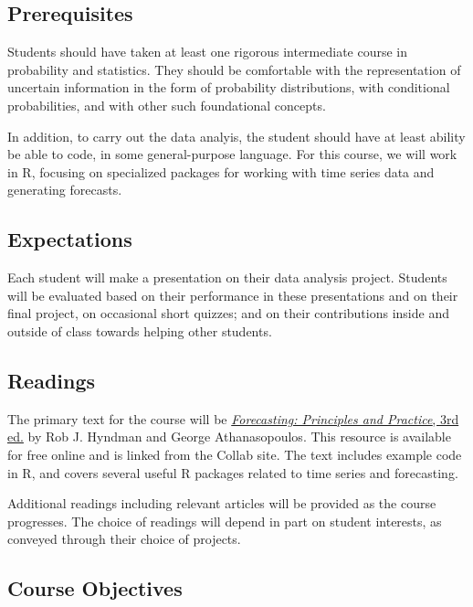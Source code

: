 \documentclass[
]{book}
\begin{document}
\hypertarget{prerequisites}{%
\subsection*{Prerequisites}\label{prerequisites}}

Students should have taken at least one rigorous intermediate course in probability and statistics. They should be comfortable with the representation of uncertain information in the form of probability distributions, with conditional probabilities, and with other such foundational concepts.

In addition, to carry out the data analyis, the student should have at least ability be able to code, in some general-purpose language. For this course, we will work in R, focusing on specialized packages for working with time series data and generating forecasts.

\hypertarget{expectations}{%
\subsection*{Expectations}\label{expectations}}

Each student will make a presentation on their data analysis project. Students will be evaluated based on their performance in these presentations and on their final project, on occasional short quizzes; and on their contributions inside and outside of class towards helping other students.

\hypertarget{readings}{%
\subsection*{Readings}\label{readings}}

The primary text for the course will be \href{https://otexts.com/fpp3/}{\emph{Forecasting: Principles and Practice}, 3rd ed.} by
Rob J. Hyndman and George Athanasopoulos. This resource is available for free online and is linked from the Collab site. The text includes example code in R, and covers several useful R packages related to time series and forecasting.

Additional readings including relevant articles will be provided as the course progresses. The choice of readings will depend in part on student interests, as conveyed through their choice of projects.

\hypertarget{course-objectives}{%
\subsection*{Course Objectives}\label{course-objectives}}
\end{document}

